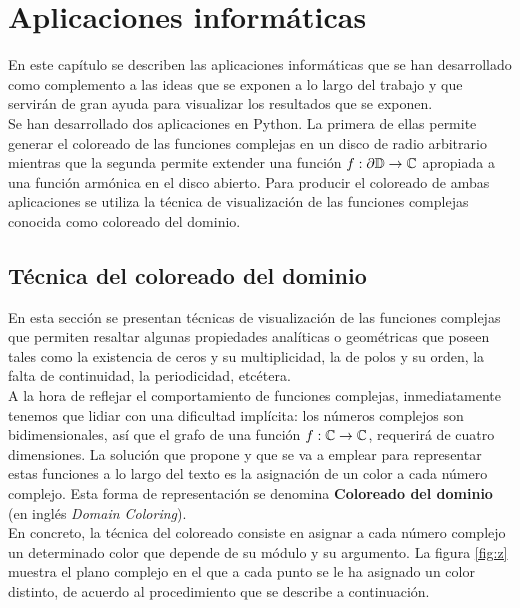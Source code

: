 \chapter{Aplicaciones informáticas}
\label{cap:aplicacion}

En este capítulo se describen las aplicaciones informáticas que se han desarrollado como complemento a las ideas que se exponen a lo largo del trabajo y que servirán de gran ayuda para visualizar los resultados que se exponen. \\

Se han desarrollado dos aplicaciones en Python. La primera de ellas permite generar el coloreado de las funciones complejas en un disco de radio arbitrario mientras que la segunda permite extender una función $f: \partial \mathbb{D} \to \mathbb{C}$ apropiada a una función armónica en el disco abierto. Para producir el coloreado de ambas aplicaciones se utiliza la técnica de visualización de las funciones complejas conocida como coloreado del dominio. \\

\section{Técnica del coloreado del dominio}

En esta sección se presentan técnicas de visualización de las funciones complejas que permiten resaltar algunas propiedades analíticas o geométricas que poseen tales como la existencia de ceros y su multiplicidad, la de polos y su orden, la falta de continuidad, la periodicidad, etcétera. \\

A la hora de reflejar el comportamiento de funciones complejas, inmediatamente tenemos que lidiar con una dificultad implícita: los números complejos son bidimensionales, así que el grafo de una función $f : \mathbb{C} \to \mathbb{C}$, requerirá de cuatro dimensiones. La solución que propone \cite{Velleman2015} y que se va a emplear para representar estas funciones a lo largo del texto es la asignación de un color a cada número complejo. Esta forma de representación se denomina \textbf{Coloreado del dominio} (en inglés \textit{Domain Coloring}). \\

En concreto, la técnica del coloreado consiste en asignar a cada número complejo un determinado color que depende de su módulo y su argumento. La figura \ref{fig:z} muestra el plano complejo en el que a cada punto se le ha asignado un color distinto, de acuerdo al procedimiento que se describe a continuación. \\

